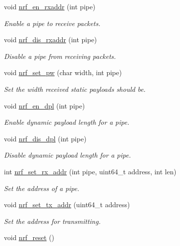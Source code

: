 \begin{DoxyCompactItemize}
void \hyperlink{group___user_func_gabda8a4fc738cba7e3d6130e635dacff1}{nrf\+\_\+en\+\_\+rxaddr} (int pipe)
\begin{DoxyCompactList}\small\item\em Enable a pipe to receive packets. \end{DoxyCompactList}\item 
void \hyperlink{group___user_func_gaf813fcdbfd3df6f8b89aa1848adce5f2}{nrf\+\_\+dis\+\_\+rxaddr} (int pipe)
\begin{DoxyCompactList}\small\item\em Disable a pipe from receiving packets. \end{DoxyCompactList}\item 
void \hyperlink{group___user_func_ga501ef571a9262e1dc5c3b7b1abcf76d9}{nrf\+\_\+set\+\_\+pw} (char width, int pipe)
\begin{DoxyCompactList}\small\item\em Set the width received static payloads should be. \end{DoxyCompactList}\item 
void \hyperlink{group___user_func_ga58dfdd90a3f6ad785a3ec57ea18a6106}{nrf\+\_\+en\+\_\+dpl} (int pipe)
\begin{DoxyCompactList}\small\item\em Enable dynamic payload length for a pipe. \end{DoxyCompactList}\item 
void \hyperlink{group___user_func_ga08f7c4fbf94b3e5b69d1e5a143853e8a}{nrf\+\_\+dis\+\_\+dpl} (int pipe)
\begin{DoxyCompactList}\small\item\em Disable dynamic payload length for a pipe. \end{DoxyCompactList}\item 
int \hyperlink{group___user_func_ga713e1f78e3468d2c82c9d98e357a5f79}{nrf\+\_\+set\+\_\+rx\+\_\+addr} (int pipe, uint64\+\_\+t address, int len)
\begin{DoxyCompactList}\small\item\em Set the address of a pipe. \end{DoxyCompactList}\item 
void \hyperlink{group___user_func_ga7cb014d392432800319725fc5fedc3c5}{nrf\+\_\+set\+\_\+tx\+\_\+addr} (uint64\+\_\+t address)
\begin{DoxyCompactList}\small\item\em Set the address for transmitting. \end{DoxyCompactList}\item 
void \hyperlink{group___user_func_gafa306c7ac8a44ea0e39287b3f18ec68a}{nrf\+\_\+reset} ()\hypertarget{group___user_func_gafa306c7ac8a44ea0e39287b3f18ec68a}{}\label{group___user_func_gafa306c7ac8a44ea0e39287b3f18ec68a}


\end{DoxyCompactItemize}
